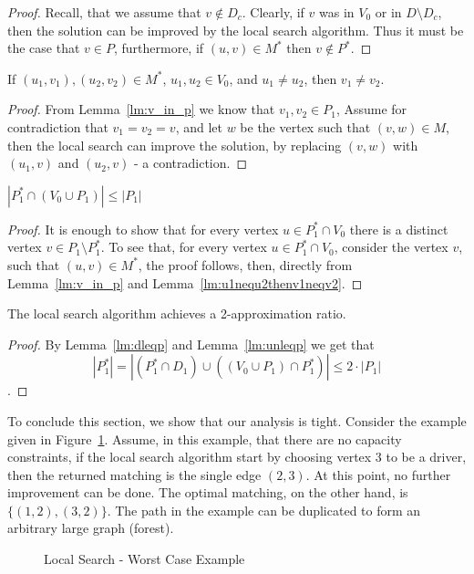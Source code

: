 \begin{proof}
Recall, that we assume that $v \notin D_c$.
Clearly, if $v$ was in $V_0$ or in $D \setminus D_c$, 
then the solution can be improved by the local search algorithm.
Thus it must be the case that $v \in P$, furthermore, 
if $(u, v) \in M^*$ then $v \notin P^*$. 
\end{proof}

\begin{lemma}
\label{lm:u1nequ2thenv1neqv2}
If $(u_1, v_1), (u_2, v_2) \in M^*$,
$u_1, u_2 \in V_0$, 
and $u_1 \neq u_2$,
then $v_1 \neq v_2$.
\end{lemma}

\begin{proof}
From Lemma~\ref{lm:v_in_p} we know that $v_1, v_2 \in P_1$,
Assume for contradiction that $v_1 = v_2 = v$,
and let $w$ be the vertex such that $(v, w) \in M$,
then the local search can improve the solution, 
by replacing $(v, w)$ with $(u_1, v)$ and $(u_2, v)$ - a contradiction.
\end{proof}

\begin{lemma}
\label{lm:unleqp}
$|P^*_1 \cap (V_0 \cup P_1)| \leq |P_1|$
\end{lemma}

\begin{proof}
It is enough to show that for every vertex $u \in P^*_1 \cap V_0$
there is a distinct vertex $v \in P_1 \setminus P^*_1$.
To see that, for every vertex $u \in P^*_1 \cap V_0$, 
consider the vertex $v$, such that $(u, v) \in M^*$, 
the proof follows, then, directly
from Lemma~\ref{lm:v_in_p} and Lemma~\ref{lm:u1nequ2thenv1neqv2}.  
\end{proof}


\begin{theorem}
The local search algorithm achieves a 2-approximation ratio.
\end{theorem}

\begin{proof}
By Lemma~\ref{lm:dleqp} and Lemma~\ref{lm:unleqp} we get that 
$$
|P^*_1| = 
|(P^*_1 \cap D_1) \cup ((V_0 \cup P_1) \cap P^*_1)| \leq 2 \cdot |P_1|
$$.
\end{proof}

To conclude this section, we show that our analysis is tight.
Consider the example given in Figure~\ref{fig:localtight}.
Assume, in this example, that there are no capacity constraints,
if the local search algorithm start by choosing vertex $3$ to be a driver, 
then the returned matching is the single edge $(2,3)$.
At this point, no further improvement can be done.
The optimal matching, on the other hand, is $\{(1, 2), (3, 2)\}$. 
The path in the example can be duplicated to form an arbitrary large graph (forest).

\begin{figure} 

\caption{
\label{fig:localtight}
Local Search - Worst Case Example
}
\end{figure}